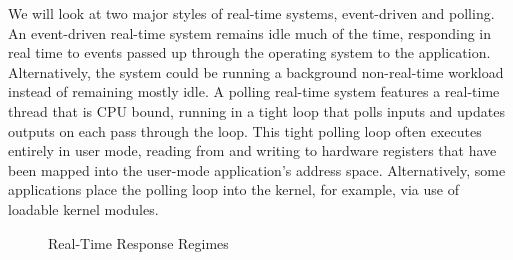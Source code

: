 We will look at two major styles of real-time systems, event-driven and
polling.
An event-driven real-time system remains idle much of the time, responding
in real time to events passed up through the operating system to the
application.
Alternatively, the system could be running a background non-real-time
workload instead of remaining mostly idle.
A polling real-time system features a real-time thread that is CPU bound,
running in a tight loop that polls inputs and updates outputs on each
pass through the loop.
This tight polling loop often executes entirely in user mode, reading from
and writing to hardware registers that have been mapped into the user-mode
application's address space.
Alternatively, some applications place the polling loop into the kernel,
for example, via use of loadable kernel modules.

\begin{figure}[tb]
\centering
{}
\caption{Real-Time Response Regimes}
\label{fig:rt:Real-Time Response Regimes}
\end{figure}

